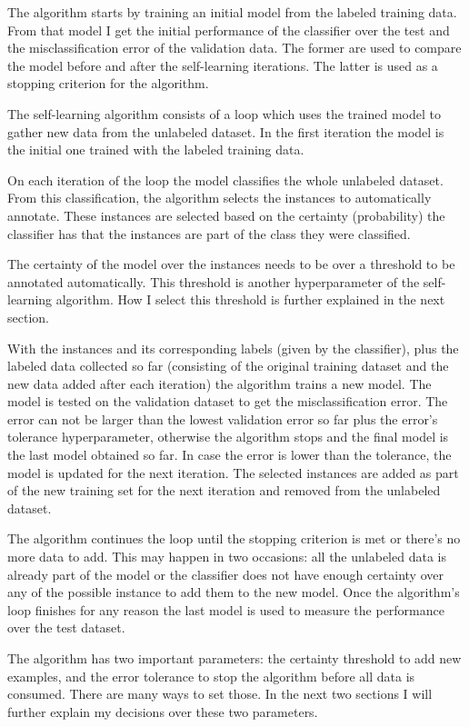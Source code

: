 The algorithm starts by training an initial model from the labeled training
data. From that model I get the initial performance of the classifier over the
test and the misclassification error of the validation data. The former are
used to compare the model before and after the self-learning iterations. The
latter is used as a stopping criterion for the algorithm.

The self-learning algorithm consists of a loop which uses the trained model to
gather new data from the unlabeled dataset. In the first iteration the model is
the initial one trained with the labeled training data.

On each iteration of the loop the model classifies the whole unlabeled dataset.
From this classification, the algorithm selects the instances to automatically
annotate. These instances are selected based on the certainty (probability) the
classifier has that the instances are part of the class they were classified. 

The certainty of the model over the instances needs to be over a threshold to
be annotated automatically. This threshold is another hyperparameter of the
self-learning algorithm. How I select this threshold is further explained in
the next section.

With the instances and its corresponding labels (given by the classifier),
plus the labeled data collected so far (consisting of the original training
dataset and the new data added after each iteration) the algorithm trains a new
model. The model is tested on the validation dataset to get the
misclassification error. The error can not be larger than the lowest validation
error so far plus the error's tolerance hyperparameter, otherwise the algorithm
stops and the final model is the last model obtained so far. In case the error
is lower than the tolerance, the model is updated for the next iteration. The
selected instances are added as part of the new training set for the next
iteration and removed from the unlabeled dataset.
 
The algorithm continues the loop until the stopping criterion is met or there's
no more data to add. This may happen in two occasions: all the unlabeled data
is already part of the model or the classifier does not have enough certainty
over any of the possible instance to add them to the new model. Once the
algorithm's loop finishes for any reason the last model is used to measure the
performance over the test dataset.

The algorithm has two important parameters: the certainty threshold to add new
examples, and the error tolerance to stop the algorithm before all data is
consumed. There are many ways to set those. In the next two sections I will
further explain my decisions over these two parameters.

